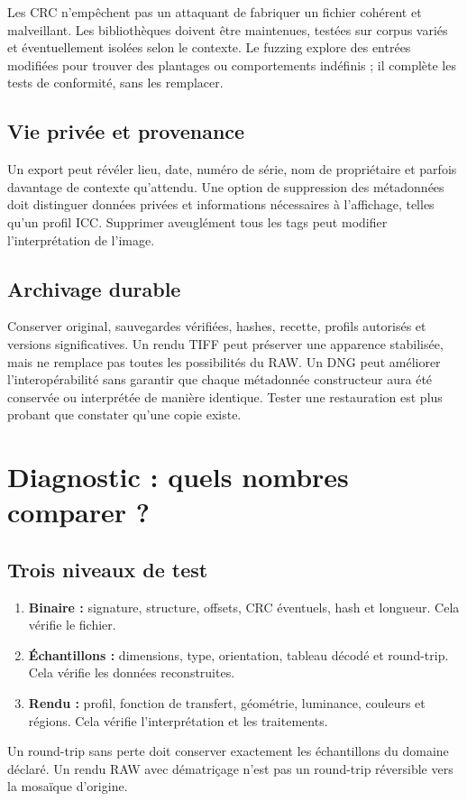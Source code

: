 Les CRC n'empêchent pas un attaquant de fabriquer
un fichier cohérent et malveillant. Les bibliothèques
doivent être maintenues, testées sur corpus variés
et éventuellement isolées selon le contexte. Le
fuzzing explore des entrées modifiées pour trouver
des plantages ou comportements indéfinis ; il
complète les tests de conformité, sans les remplacer.

\subsection{Vie privée et provenance}
Un export peut révéler lieu, date, numéro de série,
nom de propriétaire et parfois davantage de contexte
qu'attendu. Une option de suppression des métadonnées
doit distinguer données privées et informations
nécessaires à l'affichage, telles qu'un profil ICC.
Supprimer aveuglément tous les tags peut modifier
l'interprétation de l'image.

\subsection{Archivage durable}
Conserver original, sauvegardes vérifiées, hashes,
recette, profils autorisés et versions significatives.
Un rendu TIFF peut préserver une apparence stabilisée,
mais ne remplace pas toutes les possibilités du RAW.
Un DNG peut améliorer l'interopérabilité sans garantir
que chaque métadonnée constructeur aura été conservée
ou interprétée de manière identique. Tester une
restauration est plus probant que constater qu'une
copie existe.

\section{Diagnostic : quels nombres comparer ?}
\subsection{Trois niveaux de test}
\begin{enumerate}
\item \textbf{Binaire :} signature, structure, offsets,
CRC éventuels, hash et longueur. Cela vérifie le fichier.
\item \textbf{Échantillons :} dimensions, type,
orientation, tableau décodé et round-trip. Cela vérifie
les données reconstruites.
\item \textbf{Rendu :} profil, fonction de transfert,
géométrie, luminance, couleurs et régions. Cela vérifie
l'interprétation et les traitements.
\end{enumerate}
Un round-trip sans perte doit conserver exactement
les échantillons du domaine déclaré. Un rendu RAW
avec dématriçage n'est pas un round-trip réversible
vers la mosaïque d'origine.

